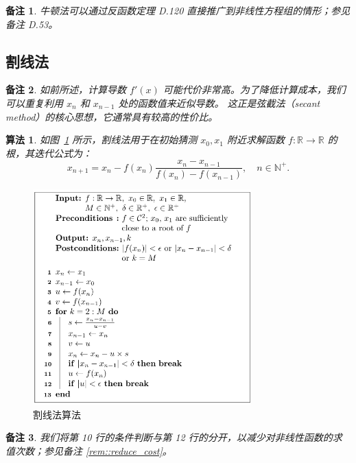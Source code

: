 \documentclass[a4paper]{ctexart}
\newtheorem{remark}{备注}
\newtheorem{algorithm}[theorem]{算法}
\numberwithin{theorem}{section}
\numberwithin{equation}{section}
\numberwithin{figure}{section}
\numberwithin{remark}{section}
\begin{document}
\begin{remark}
牛顿法可以通过反函数定理 D.120 直接推广到非线性方程组的情形；参见备注 D.53。
\end{remark}

\subsection{割线法}

\begin{remark}
如前所述，计算导数 \( f'(x) \) 可能代价非常高。为了降低计算成本，我们可以重复利用 \( x_n \) 和 \( x_{n-1} \) 处的函数值来近似导数。
这正是弦截法（secant method）的核心思想，它通常具有较高的性价比。
\end{remark}

\begin{algorithm}
如图~\ref{fig::secant-alg} 所示，割线法用于在初始猜测 \( x_0, x_1 \) 附近求解函数 \( f : \mathbb{R} \to \mathbb{R} \) 的根，其迭代公式为：
\begin{equation}
    \label{eq::secant}
x_{n+1} = x_n - f(x_n) \frac{x_n - x_{n-1}}{f(x_n) - f(x_{n-1})}, \quad n \in \mathbb{N}^+.
\end{equation}
    
\end{algorithm}

\begin{figure}
\centering
\includegraphics[width=0.75\textwidth]{images/secant_method.png} %
\caption{割线法算法}
\label{fig::secant-alg}
\end{figure}

\begin{remark}
我们将第 10 行的条件判断与第 12 行的分开，以减少对非线性函数的求值次数；参见备注 \ref{rem::reduce_cost}。
\end{remark}
\end{document}
